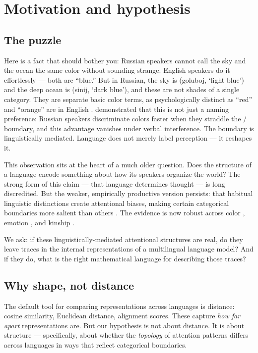 \chapter{Motivation and hypothesis}
\label{ch:motivation}

\section{The puzzle}

Here is a fact that should bother you: Russian speakers cannot call the sky and the ocean the same color without sounding strange. English speakers do it effortlessly --- both are ``blue.'' But in Russian, the sky is  (goluboj, `light blue') and the deep ocean is  (sinij, `dark blue'), and these are not shades of a single category. They are separate basic color terms, as psychologically distinct as ``red'' and ``orange'' are in English \parencite{paramei2005}. \textcite{winawer2007} demonstrated that this is not just a naming preference: Russian speakers discriminate colors faster when they straddle the / boundary, and this advantage vanishes under verbal interference. The boundary is linguistically mediated. Language does not merely label perception --- it reshapes it.

This observation sits at the heart of a much older question. Does the structure of a language encode something about how its speakers organize the world? The strong form of this claim --- that language determines thought --- is long discredited. But the weaker, empirically productive version persists: that habitual linguistic distinctions create attentional biases, making certain categorical boundaries more salient than others \parencite{lupyan2020}. The evidence is now robust across color \parencite{davidoff1999, winawer2007}, emotion \parencite{wierzbicka1999, pavlenko2005}, and kinship \parencite{friedrich1964}.

We ask: if these linguistically-mediated attentional structures are real, do they leave traces in the internal representations of a multilingual language model? And if they do, what is the right mathematical language for describing those traces?

\section{Why shape, not distance}

The default tool for comparing representations across languages is distance: cosine similarity, Euclidean distance, alignment scores. These capture \emph{how far apart} representations are. But our hypothesis is not about distance. It is about structure --- specifically, about whether the \emph{topology} of attention patterns differs across languages in ways that reflect categorical boundaries.

